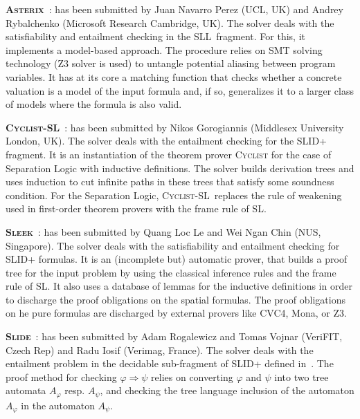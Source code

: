 \documentclass[twoside,11pt]{article}
\newcommand{\limp}{\Rightarrow}
\newcommand{\SLRD}{\textsc{SLID}}
\newcommand{\SLL}{\textsc{SLL}}
\newcommand{\ASTERIX}{\textsc{Asterix}}
\newcommand{\CYCLIST}{\textsc{Cyclist-SL}}
\newcommand{\SLEEK}{\textsc{Sleek}}
\newcommand{\SLIDE}{\textsc{Slide}}
\begin{document}
\smallskip
\noindent
\textbf{\ASTERIX}~\cite{PerezR13}: 
has been submitted by 
Juan Navarro Perez (UCL, UK) and 
Andrey Rybalchenko (Microsoft Research Cambridge, UK).
The solver deals with the satisfiability and entailment checking in the \SLL\ fragment.
For this, it implements a model-based approach.
The procedure relies on SMT solving technology (Z3 solver is used) to untangle potential aliasing between program variables. 
It has at its core a matching function that checks whether a concrete valuation is a model of the input formula and, if so, generalizes it to a larger class of models where the formula is also valid.  


\medskip
\noindent
\textbf{\CYCLIST}~\cite{BrotherstonGP12,CYCLISTsite}:
has been submitted by 
Nikos Gorogiannis (Middlesex University London, UK).
The solver deals with the entailment checking for the \SLRD+ fragment.
It is an instantiation of the theorem prover \textsc{Cyclist} for the case of Separation Logic with inductive definitions. 
The solver builds derivation trees and uses induction to cut infinite paths in these trees
that satisfy some soundness condition. 
For the Separation Logic, \CYCLIST\ replaces the rule of weakening used in first-order theorem provers with the frame rule of SL.


\medskip
\noindent
\textbf{\SLEEK}~\cite{ChinDNQ12,SLEEKsite}:
has been submitted by 
Quang Loc Le and Wei Ngan Chin (NUS, Singapore).
The solver deals with the satisfiability and entailment checking for \SLRD+ formulas.
It is an (incomplete but) automatic prover, that builds a proof tree for the input problem by using the classical inference rules and the frame rule of SL. It also uses a database of lemmas for the inductive definitions in order to discharge the proof obligations on the spatial formulas.
%
The proof obligations on he pure formulas are discharged by external provers like CVC4, Mona, or Z3.

\medskip
\noindent
\textbf{\SLIDE}~\cite{IosifRV14,SLIDEsite}: 
has been submitted by 
Adam Rogalewicz and Tomas Vojnar (VeriFIT, Czech Rep) and
Radu Iosif (Verimag, France).
The solver deals with the entailment problem in the decidable sub-fragment of \SLRD+ defined in~\cite{IosifRS13}.
The proof method for checking $\varphi\limp\psi$ relies on converting $\varphi$ and $\psi$ into two tree automata $A_\varphi$ resp. $A_\psi$, and checking
the tree language inclusion of the automaton $A_\varphi$ in the automaton $A_\psi$.
\end{document}
